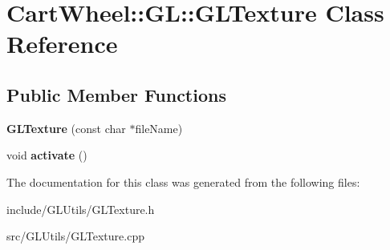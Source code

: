 \hypertarget{classCartWheel_1_1GL_1_1GLTexture}{
\section{CartWheel::GL::GLTexture Class Reference}
\label{classCartWheel_1_1GL_1_1GLTexture}
}
\subsection*{Public Member Functions}
\begin{DoxyCompactItemize}
\item 
\hypertarget{classCartWheel_1_1GL_1_1GLTexture_a3c33d66972a6bf0cd49fd1b8c895c050}{
{\bfseries GLTexture} (const char $\ast$fileName)}
\label{classCartWheel_1_1GL_1_1GLTexture_a3c33d66972a6bf0cd49fd1b8c895c050}

\item 
\hypertarget{classCartWheel_1_1GL_1_1GLTexture_a592842b10b8b20b465dad278f7b710a5}{
void {\bfseries activate} ()}
\label{classCartWheel_1_1GL_1_1GLTexture_a592842b10b8b20b465dad278f7b710a5}

\end{DoxyCompactItemize}


The documentation for this class was generated from the following files:\begin{DoxyCompactItemize}
\item 
include/GLUtils/GLTexture.h\item 
src/GLUtils/GLTexture.cpp\end{DoxyCompactItemize}
